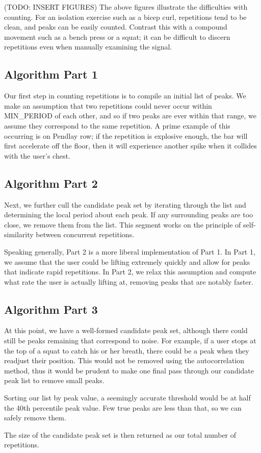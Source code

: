 (TODO: INSERT FIGURES) The above figures illustrate the difficulties with counting. For an isolation exercise such as a bicep curl, repetitions tend to be clean, and peaks can be easily counted. Contrast this with a compound movement such as a bench press or a squat; it can be difficult to discern repetitions even when manually examining the signal.

\subsection{Algorithm Part 1}
Our first step in counting repetitions is to compile an initial list of peaks. We make an assumption that two repetitions could never occur within MIN\_PERIOD of each other, and so if two peaks are ever within that range, we assume they correspond to the same repetition. A prime example of this occurring is on Pendlay row; if the repetition is explosive enough, the bar will first accelerate off the floor, then it will experience another spike when it collides with the user's chest. 

\subsection{Algorithm Part 2}
Next, we further cull the candidate peak set by iterating through the list and determining the local period about each peak. If any surrounding peaks are too close, we remove them from the list. This segment works on the principle of self-similarity between concurrent repetitions. 

Speaking generally, Part 2 is a more liberal implementation of Part 1. In Part 1, we assume that the user could be lifting extremely quickly and allow for peaks that indicate rapid repetitions. In Part 2, we relax this assumption and compute what rate the user is actually lifting at, removing peaks that are notably faster. 

\subsection{Algorithm Part 3}
At this point, we have a well-formed candidate peak set, although there could still be peaks remaining that correspond to noise. For example, if a user stops at the top of a squat to catch his or her breath, there could be a peak when they readjust their position. This would not be removed using the autocorrelation method, thus it would be prudent to make one final pass through our candidate peak list to remove small peaks. 

Sorting our list by peak value, a seemingly accurate threshold would be at half the 40th percentile peak value. Few true peaks are less than that, so we can safely remove them. 

The size of the candidate peak set is then returned as our total number of repetitions.